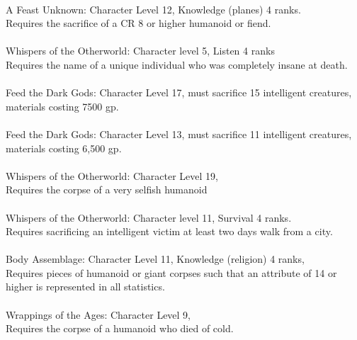 \begin{multicols}{2}
\begin{small}
\listone
{}\\
A Feast Unknown: Character Level 12, Knowledge (planes) 4 ranks.\\
Requires the sacrifice of a CR 8 or higher humanoid or fiend.\\
\\
Whispers of the Otherworld: Character level 5, Listen 4 ranks\\
Requires the name of a unique individual who was completely insane at death.\\
\\
Feed the Dark Gods: Character Level 17, must sacrifice 15 intelligent creatures, materials costing 7500 gp.\\
\vspace{10pt}
\\
Feed the Dark Gods: Character Level 13, must sacrifice 11 intelligent creatures, materials costing 6,500 gp.\\
\\
Whispers of the Otherworld: Character Level 19, \\
Requires the corpse of a very selfish humanoid\\
\\
Whispers of the Otherworld: Character level 11, Survival 4 ranks.\\
Requires sacrificing an intelligent victim at least two days walk from a city.\\
\vspace{30pt}
\\
Body Assemblage: Character Level 11, Knowledge (religion) 4 ranks, \\
Requires pieces of humanoid or giant corpses such that an attribute of 14 or higher is represented in all statistics.\\
\\
Wrappings of the Ages: Character Level 9, \\
Requires the corpse of a humanoid who died of cold.\\

\end{small}
\end{multicols}
